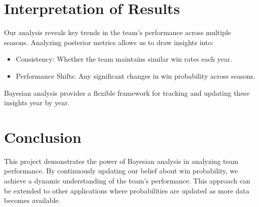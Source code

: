 \section{Interpretation of Results}

Our analysis reveals key trends in the team’s performance across multiple seasons.
Analyzing posterior metrics allows us to draw insights into:

\begin{itemize}
  \item Consistency: Whether the team maintains similar win rates each year.
  \item Performance Shifts: Any significant changes in win probability across seasons.
\end{itemize}

Bayesian analysis provides a flexible framework for tracking and updating these insights year by year.

\section{Conclusion}

This project demonstrates the power of Bayesian analysis in analyzing team performance.
By continuously updating our belief about win probability, we achieve a dynamic understanding of the team’s performance.
This approach can be extended to other applications where probabilities are updated as more data becomes available.
